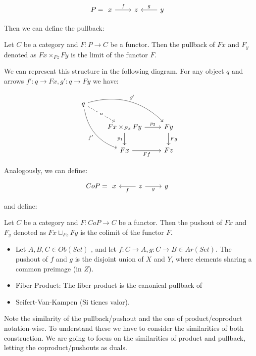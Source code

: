 \[
  P = \begin{tikzcd}
    x\arrow{r}{f} & z & y\arrow[swap]{l}{g}
\end{tikzcd}
\]

Then we can define the pullback:

\begin{definition}
  Let $C$ be a category and $F:P\to C$ be a functor. Then the pullback of $Fx$ and $F_y$ denoted as $Fx\times_{Fz}Fy$ is the limit of the functor $F$.
\end{definition}

We can represent this structure in the following diagram. For any object $q$ and arrows $f':q\to Fx,g':q\to Fy$ we have:

\[
\begin{tikzcd}
q
\arrow[bend left]{drr}{g'}
\arrow[bend right,swap]{ddr}{f'}
\arrow[dashed]{dr}[description]{u} & & \\
& Fx\times_{Fz}Fy \arrow{r}{p_2} \arrow{d}[swap]{p_1}
& Fy \arrow{d}{Fg} \\
& Fx \arrow[swap]{r}{Ff}
& Fz
\end{tikzcd}
\]

Analogously, we can define:

\[
  CoP = \begin{tikzcd}
    x & z\arrow{l}{f}\arrow[swap]{r}{g} & y
\end{tikzcd}
\]

and define:
\begin{definition}
  Let $C$ be a category and $F:CoP\to C$ be a functor. Then the pushout of $Fx$ and $F_y$ denoted as $Fx\sqcup_{Fz}Fy$ is the colimit of the functor $F$.
\end{definition}

\begin{example}
  \begin{itemize}
  \item Let $A,B,C\in Ob(Set)$ , and let  $f : C \to A, g : C \to B\in Ar(Set)$. The pushout of $f$ and $g$ is the disjoint union of $X$ and $Y$, where elements sharing a common preimage (in $Z$).

  \item Fiber Product: The fiber product is the canonical pullback of 

   \item Seifert-Van-Kampen (Si tienes valor).
  \end{itemize}
\end{example}

Note the  similarity of the pullback/pushout and the one of product/coproduct notation-wise. To understand these we have to consider the similarities of both construction. We are going to focus on the similarities of product and pullback, letting the coproduct/pushouts as duals.\\

